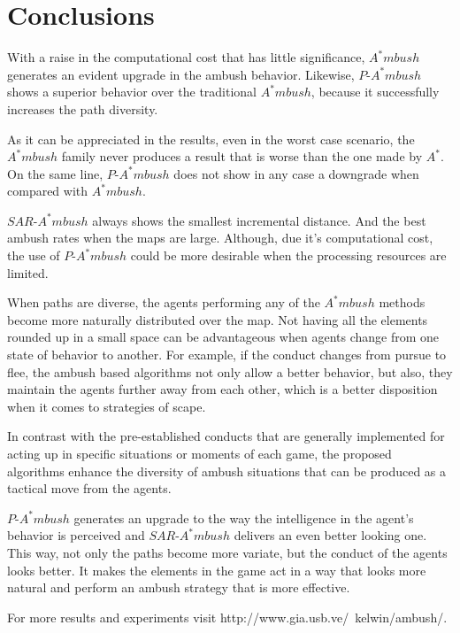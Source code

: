\section{Conclusions}

With a raise in the computational cost that has little significance,
$A^*mbush$ generates an evident upgrade in the ambush behavior.
Likewise, $P$-$A^*mbush$ shows a superior behavior over the traditional
$A^*mbush$, because it successfully increases the path diversity.


As it can be appreciated in the results, even in the worst case scenario, 
the $A^*mbush$ family never produces a result that is worse than the one made
by $A^*$. On the same line, $P$-$A^*mbush$ does not show in any
case a downgrade when compared with $A^*mbush$. 

$SAR$-$A^*mbush$ always shows the smallest incremental distance. And the
best ambush rates when the maps are large. Although, due it's computational
cost, the use of $P$-$A^*mbush$ could be more desirable when the
 processing resources are limited.

When paths are diverse, the agents performing any of the $A^*mbush$ 
methods become more naturally distributed over the map. 
Not having all the elements rounded up in a small space
can be advantageous when agents change from
one state of behavior to another. For example, if the conduct changes 
from pursue to flee, the ambush based algorithms not only allow a
better behavior, but also, they maintain the agents further away from each
other, which is a better disposition when it comes to strategies of scape.

In contrast with the pre-established conducts that are generally implemented 
for acting up in specific situations or moments of each game, the
proposed algorithms enhance the diversity of ambush situations that
can be produced as a tactical move from the agents. 

$P$-$A^*mbush$ generates an upgrade to the way the intelligence 
in the agent's behavior is perceived and $SAR$-$A^*mbush$ delivers an
even better looking one. This way, not only the paths become 
more variate, but the conduct of the agents looks better.
It makes the elements in the game act in a way that looks more
natural and perform an ambush strategy that is more effective.

For more results and experiments visit  http://www.gia.usb.ve/~kelwin/ambush/.
  